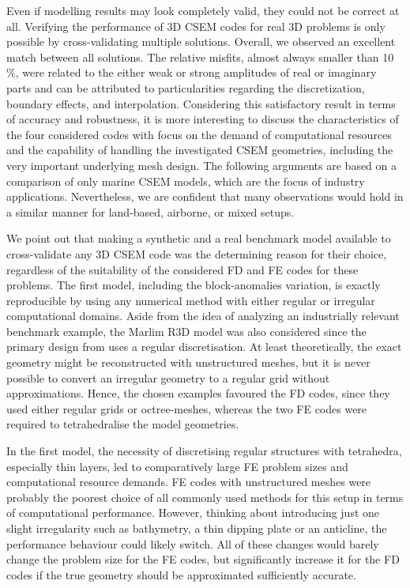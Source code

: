 \documentclass[
    paper,
  ]{geophysics}
\begin{document}
Even if modelling results may look completely valid, they could not be correct at all. Verifying the performance of 3D CSEM codes for real 3D problems is only possible by cross-validating multiple solutions. Overall, we observed an excellent match between all solutions. The relative misfits, almost always smaller than 10\,\%, were related to the either weak or strong amplitudes of real or imaginary parts and can be attributed to particularities regarding the discretization, boundary effects, and interpolation. Considering this satisfactory result in terms of accuracy and robustness, it is more interesting to discuss the characteristics of the four considered codes with focus on the demand of computational resources and the capability of handling the investigated CSEM geometries, including the very important underlying mesh design. The following arguments are based on a comparison of only marine CSEM models, which are the focus of industry applications. Nevertheless, we are confident that many observations would hold in a similar manner for land-based, airborne, or mixed setups.

We point out that making a synthetic and a real benchmark model available to cross-validate any 3D CSEM code was the determining reason for their choice, regardless of the suitability of the considered FD and FE codes for these problems. The first model, including the block-anomalies variation, is exactly reproducible by using any numerical method with either regular or irregular computational domains. Aside from the idea of analyzing an industrially relevant benchmark example, the Marlim R3D model was also considered since the primary design from \cite{GEO.19.Correa} uses a regular discretisation. At least theoretically, the exact geometry might be reconstructed with unstructured meshes, but it is never possible to convert an irregular geometry to a regular grid without approximations. Hence, the chosen examples favoured the FD codes, since they used either regular grids or octree-meshes, whereas the two FE codes were required to tetrahedralise the model geometries.

In the first model, the necessity of discretising regular structures with tetrahedra, especially thin layers, led to comparatively large FE problem sizes and computational resource demands. FE codes with unstructured meshes were probably the poorest choice of all commonly used methods for this setup in terms of computational performance. However, thinking about introducing just one slight irregularity such as bathymetry, a thin dipping plate or an anticline, the performance behaviour could likely switch. All of these changes would barely change the problem size for the FE codes, but significantly increase it for the FD codes if the true geometry should be approximated sufficiently accurate.
\end{document}
